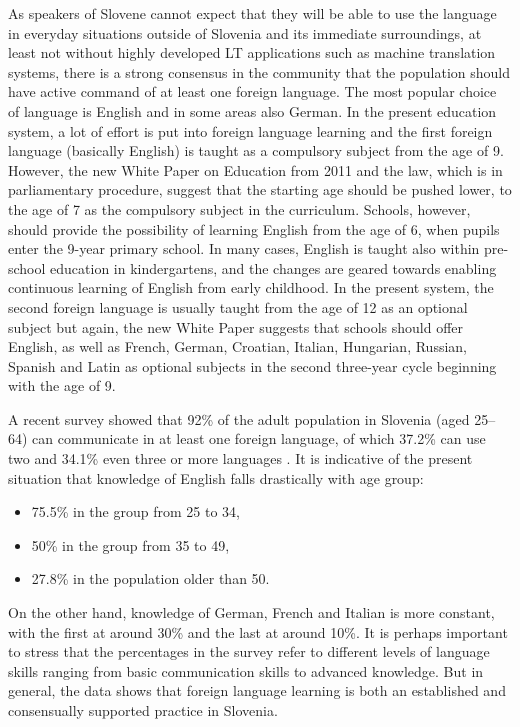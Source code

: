 \begin{multicols}{2}
As speakers of Slovene cannot expect that they will be able to use the language in everyday situations outside of Slovenia and its immediate surroundings, at least not without highly developed LT applications such as machine translation systems, there is a strong consensus in the community that the population should have active command of at least one foreign language. The most popular choice of language is English and in some areas also German. In the present education system, a lot of effort is put into foreign language learning and the first foreign language (basically English) is taught as a compulsory subject from the age of 9. However, the new White Paper on Education  from 2011  \cite{BK1} and the law, which is in parliamentary procedure, suggest that the starting age should be pushed lower, to the age of 7 as the compulsory subject in the curriculum. Schools, however, should provide the possibility of learning English from the age of 6, when pupils enter the 9-year primary school. In many cases, English is taught also within pre-school education in kindergartens, and the changes are geared towards enabling continuous learning of English from early childhood. In the present system, the second foreign language is usually taught from the age of 12 as an optional subject but again, the new White Paper suggests that schools should offer English, as well as French, German, Croatian, Italian, Hungarian, Russian, Spanish and Latin as optional subjects in the second three-year cycle beginning with the age of 9. 

A recent survey showed that 92\% of the adult population in Slovenia (aged 25--64) can communicate in at least one foreign language, of which 37.2\% can use two and 34.1\% even three or more languages \cite{SURS2}.  It is indicative of the present situation that knowledge of English falls drastically with age group: 
\begin{itemize}
\item 75.5\% in the group from 25 to 34, 
\item 50\% in the group from 35 to 49, 
\item 27.8\% in the population older than 50.
\end{itemize}
On the other hand, knowledge of German, French and Italian is more constant, with the first at around 30\% and the last at around 10\%. It is perhaps important to stress that the percentages in the survey refer to different levels of language skills ranging from basic communication skills to advanced knowledge. But in general, the data shows that foreign language learning is both an established and consensually supported practice in Slovenia.


\end{multicols}
